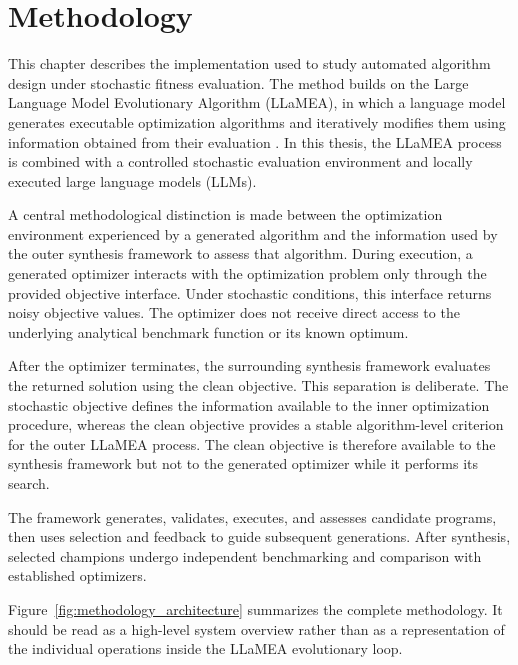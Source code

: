 \chapter{Methodology}
\label{chap:methodology}

This chapter describes the implementation used to study automated algorithm
design under stochastic fitness evaluation. The method builds on the Large
Language Model Evolutionary Algorithm (LLaMEA), in which a language model
generates executable optimization algorithms and iteratively modifies them
using information obtained from their evaluation \cite{LLaMEA2024}. In this
thesis, the LLaMEA process is combined with a controlled stochastic
evaluation environment and locally executed large language models (LLMs).

A central methodological distinction is made between the optimization
environment experienced by a generated algorithm and the information used by
the outer synthesis framework to assess that algorithm. During execution, a
generated optimizer interacts with the optimization problem only through the
provided objective interface. Under stochastic conditions, this interface
returns noisy objective values. The optimizer does not receive direct access to the underlying analytical
benchmark function or its known optimum.

After the optimizer terminates, the surrounding synthesis framework evaluates
the returned solution using the clean objective. This separation is deliberate.
The stochastic objective defines the information available to the inner
optimization procedure, whereas the clean objective provides a stable
algorithm-level criterion for the outer LLaMEA process. The clean objective is
therefore available to the synthesis framework but not to the generated
optimizer while it performs its search.

The framework generates, validates, executes, and assesses candidate
programs, then uses selection and feedback to guide subsequent generations.
After synthesis, selected champions undergo independent benchmarking and
comparison with established optimizers.

Figure~\ref{fig:methodology_architecture} summarizes the complete methodology.
It should be read as a high-level system overview rather than as a
representation of the individual operations inside the LLaMEA evolutionary
loop.

